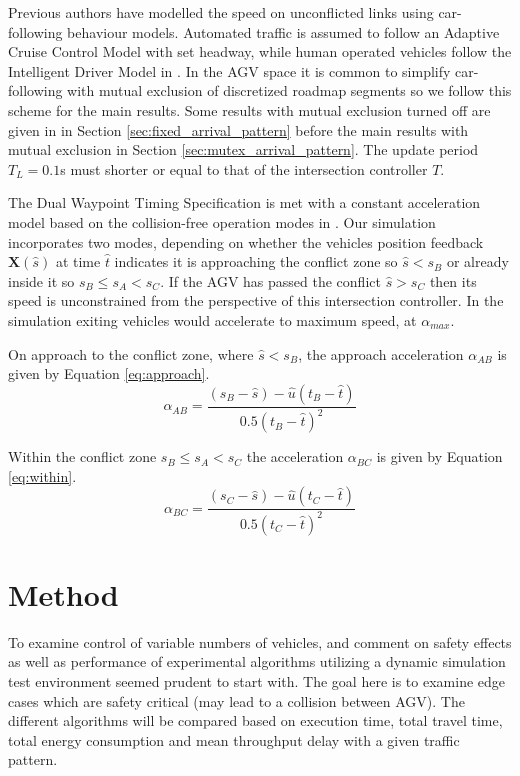 Previous authors have modelled the speed on unconflicted links using car-following behaviour models. Automated traffic is assumed to follow an Adaptive Cruise Control Model with set headway, while human operated vehicles follow the Intelligent Driver Model in \cite{Baz2020}. In the AGV space it is common to simplify car-following with mutual exclusion of discretized roadmap segments  \cite{Digani2014coord} so we follow this scheme for the main results. Some results with mutual exclusion turned off are given in  in Section \ref{sec:fixed_arrival_pattern} before the main results with mutual exclusion in Section \ref{sec:mutex_arrival_pattern}. The update period $T_L=0.1$s must shorter or equal to that of the intersection controller $T$. 

The Dual Waypoint Timing Specification is met with a constant acceleration model based on the collision-free operation modes in \cite{He2020}. 
Our simulation incorporates two modes, depending on whether the vehicles position feedback $\bm{X}(\hat{s})$ at time $\hat{t}$ indicates it is approaching the conflict zone so $\hat{s}<s_B$ or already inside it so $s_B\leq s_A<s_C$. If the AGV has passed the conflict $\hat{s}>s_C$ then its speed is unconstrained from the perspective of this intersection controller. In the simulation exiting vehicles would accelerate to maximum speed, at $\alpha_{max}$.

On approach to the conflict zone, where $\hat{s}<s_B$, the approach acceleration $\alpha_{AB}$ is given by Equation \ref{eq:approach}.
\begin{equation}
\alpha_{AB} = \frac{(s_B - \hat{s}) - \hat{u}(t_B - \hat{t}) }{0.5 (t_B - \hat{t})^2}
\label{eq:approach}
\end{equation}

Within the conflict zone $s_B \leq s_A<s_C$ the acceleration $\alpha_{BC}$ is given by Equation \ref{eq:within}.
\begin{equation}
\alpha_{BC} = \frac{(s_C - \hat{s}) - \hat{u}(t_C - \hat{t}) }{0.5 (t_C - \hat{t})^2}
\label{eq:within}
\end{equation}

\section{Method}
To examine control of variable numbers of vehicles, and comment on safety effects as well as performance of experimental algorithms utilizing a dynamic simulation test environment seemed prudent to start with. The goal here is to examine edge cases which are safety critical (may lead to a collision between AGV). The different algorithms will be compared based on execution time, total travel time, total energy consumption and mean throughput delay with a given traffic pattern.

